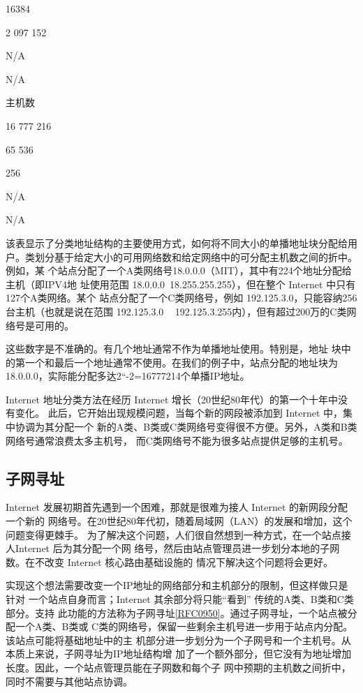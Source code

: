 16384

2 097 152

N/A

N/A

主机数

16 777 216

65 536

256

N/A

N/A

该表显示了分类地址结构的主要使用方式，如何将不同大小的单播地址块分配给用
户。类划分基于给定大小的可用网络数和给定网络中的可分配主机数之间的折中。例如，某
个站点分配了一个A类网络号18.0.0.0（MIT），其中有224个地址分配给主机（即IPV4地
址使用范围 18.0.0.0~18.255.255.255），但在整个 Internet 中只有127个A类网络。某个
站点分配了一个C类网络号，例如 192.125.3.0，只能容纳256台主机（也就是说在范围
192.125.3.0 ~ 192.125.3.255内），但有超过200万的C类网络号是可用的。

\begin{tcolorbox}
    这些数字是不准确的。有几个地址通常不作为单播地址使用。特别是，地址
    块中的第一个和最后一个地址通常不使用。在我们的例子中，站点分配的地址块为
    18.0.0.0，实际能分配多达2“-2=16777214个单播IP地址。
\end{tcolorbox}

Internet 地址分类方法在经历 Internet 增长（20世纪80年代）的第一个十年中没有变化。
此后，它开始出现规模问题，当每个新的网段被添加到 Internet 中，集中协调为其分配一个
新的A类、B类或C类网络号变得很不方便。另外，A类和B类网络号通常浪费太多主机号，
而C类网络号不能为很多站点提供足够的主机号。

\subsection{子网寻址}
Internet 发展初期首先遇到一个困难，那就是很难为接人 Internet 的新网段分配一个新的
网络号。在20世纪80年代初，随着局域网（LAN）的发展和增加，这个问题变得更棘手。
为了解决这个问题，人们很自然想到一种方式，在一个站点接人Internet 后为其分配一个网
络号，然后由站点管理员进一步划分本地的子网数。在不改变 Internet 核心路由基础设施的
情况下解决这个问题将会更好。

实现这个想法需要改变一个IP地址的网络部分和主机部分的限制，但这样做只是针对
一个站点自身而言；Internet 其余部分将只能“看到” 传统的A类、B类和C类部分。支持
此功能的方法称为子网寻址\href{https://www.rfc-editor.org/rfc/rfc0950}{[RFC0950]}。通过子网寻址，一个站点被分配一个A类、B类或
C类的网络号，保留一些剩余主机号进一步用于站点内分配。该站点可能将基础地址中的主
机部分进一步划分为一个子网号和一个主机号。从本质上来说，子网寻址为IP地址结构增
加了一个额外部分，但它没有为地址增加长度。因此，一个站点管理员能在子网数和每个子
网中预期的主机数之间折中，同时不需要与其他站点协调。

